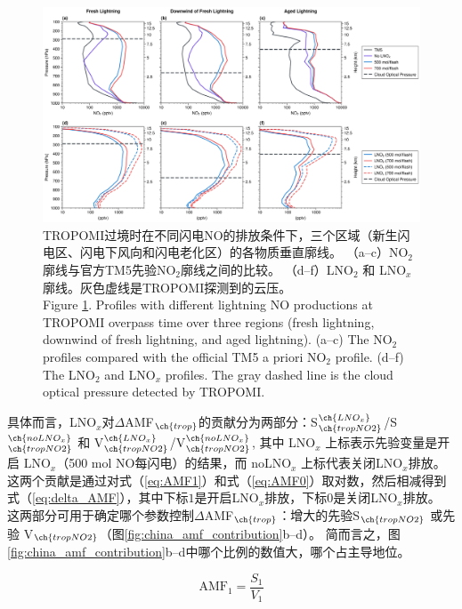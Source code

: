 \begin{figure}[!htbp]
    \includegraphics[width=17cm]{./figures/china_nox_profile.png}
    \caption{
    TROPOMI过境时在不同闪电NO的排放条件下，三个区域（新生闪电区、闪电下风向和闪电老化区）的各物质垂直廓线。
    （a--c）NO$_2$廓线与官方TM5先验NO$_2$廓线之间的比较。
    （d--f）LNO$_2$ 和 LNO$_x$廓线。灰色虚线是TROPOMI探测到的云压。\\
     Figure \ref{fig:china_nox_profile}. Profiles with different lightning NO productions at TROPOMI overpass time over three regions (fresh lightning, downwind of fresh lightning, and aged lightning).
    (a--c) The NO$_2$ profiles compared with the official TM5 a priori NO$_2$ profile.
    (d--f) The LNO$_2$ and LNO$_x$ profiles.
    The gray dashed line is the cloud optical pressure detected by TROPOMI.
    }
    \label{fig:china_nox_profile}
\end{figure}


具体而言，LNO$_x$对$\Delta$AMF$_{\ch{trop}}$的贡献分为两部分：S$^{\ch{LNO_x}}_{\ch{tropNO2}}$/S$^{\ch{noLNO_x}}_{\ch{tropNO2}}$ 和 V$^{\ch{LNO_x}}_{\ch{tropNO2}}$/V$^{\ch{noLNO_x}}_{\ch{tropNO2}}$,
其中 LNO$_x$ 上标表示先验变量是开启 LNO$_x$（500 mol NO每闪电）的结果，而 noLNO$_x$ 上标代表关闭LNO$_x$排放。
这两个贡献是通过对式（\ref{eq:AMF1}）和式（\ref{eq:AMF0}）取对数，然后相减得到式（\ref{eq:delta_AMF}），其中下标$1$是开启LNO$_x$排放，下标$0$是关闭LNO$_x$排放。
这两部分可用于确定哪个参数控制$\Delta$AMF$_{\ch{trop}}$：增大的先验S$_{\ch{tropNO2}}$ 或先验 V$_{\ch{tropNO2}}$（图\ref{fig:china_amf_contribution}b--d）。
简而言之，图\ref{fig:china_amf_contribution}b--d中哪个比例的数值大，哪个占主导地位。

\begin{equation} \label{eq:AMF1}
\textrm{AMF}_1 = \frac{S_1}{V_1}
\end{equation}

